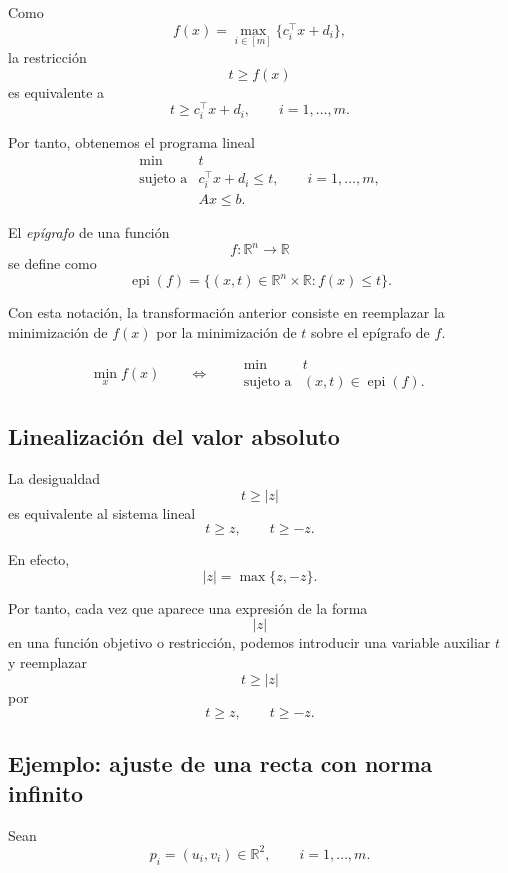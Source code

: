 Como
\[
    f(x)=\max_{i\in[m]}\{c_i^\top x+d_i\},
\]
la restricción
\[
    t\geq f(x)
\]
es equivalente a
\[
    t\geq c_i^\top x+d_i,
    \qquad i=1,\dots,m.
\]

Por tanto, obtenemos el programa lineal
\[
    \begin{array}{ll}
        \min & t\\[1mm]
        \text{sujeto a}
        & c_i^\top x+d_i\leq t,
        \qquad i=1,\dots,m,\\
        & Ax\leq b.
    \end{array}
\]

\begin{definition}[Epígrafo]
El \emph{epígrafo} de una función
\[
    f:\mathbb{R}^n\to\mathbb{R}
\]
se define como
\[
    \operatorname{epi}(f)
    =
    \{(x,t)\in\mathbb{R}^n\times\mathbb{R}:f(x)\leq t\}.
\]
\end{definition}

Con esta notación, la transformación anterior consiste en reemplazar la minimización de \(f(x)\) por la minimización de \(t\) sobre el epígrafo de \(f\).

\[
    \min_x f(x)
    \qquad
    \Longleftrightarrow
    \qquad
    \begin{array}{ll}
        \min & t\\
        \text{sujeto a} & (x,t)\in \operatorname{epi}(f).
    \end{array}
\]

\subsection{Linealización del valor absoluto}

La desigualdad
\[
    t\geq |z|
\]
es equivalente al sistema lineal
\[
    t\geq z,
    \qquad
    t\geq -z.
\]

En efecto,
\[
    |z|=\max\{z,-z\}.
\]

Por tanto, cada vez que aparece una expresión de la forma
\[
    |z|
\]
en una función objetivo o restricción, podemos introducir una variable auxiliar \(t\) y reemplazar
\[
    t\geq |z|
\]
por
\[
    t\geq z,
    \qquad
    t\geq -z.
\]

\subsection{Ejemplo: ajuste de una recta con norma infinito}

Sean
\[
    p_i=(u_i,v_i)\in\mathbb{R}^2,
    \qquad i=1,\dots,m.
\]

